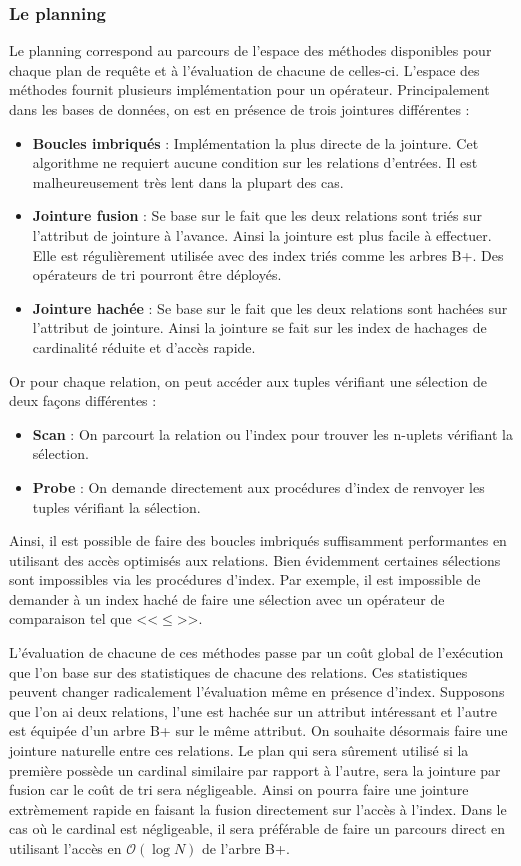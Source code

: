 \subsubsection{Le planning}
Le planning correspond au parcours de l'espace des méthodes disponibles pour chaque plan de requête et à l'évaluation de chacune de celles-ci. L'espace des méthodes fournit plusieurs implémentation pour un opérateur. Principalement dans les bases de données, on est en présence de trois jointures différentes : 
\begin{itemize}
    \item \textbf{Boucles imbriqués} : Implémentation la plus directe de la jointure. Cet algorithme ne requiert aucune condition sur les relations d'entrées. Il est malheureusement très lent dans la plupart des cas.
    \item \textbf{Jointure fusion} : Se base sur le fait que les deux relations sont triés sur l'attribut de jointure à l'avance. Ainsi la jointure est plus facile à effectuer. Elle est régulièrement utilisée avec des index triés comme les arbres B+. Des opérateurs de tri pourront être déployés. 
    \item \textbf{Jointure hachée} : Se base sur le fait que les deux relations sont hachées sur l'attribut de jointure. Ainsi la jointure se fait sur les index de hachages de cardinalité réduite et d'accès rapide. 
\end{itemize}

Or pour chaque relation, on peut accéder aux tuples vérifiant une sélection de deux façons différentes : 
\begin{itemize}
 \item \textbf{Scan} : On parcourt la relation ou l'index pour trouver les n-uplets vérifiant la sélection.
 \item \textbf{Probe} : On demande directement aux procédures d'index de renvoyer les tuples vérifiant la sélection. 
\end{itemize}

Ainsi, il est possible de faire des boucles imbriqués suffisamment performantes en utilisant des accès optimisés aux relations. Bien évidemment certaines sélections sont impossibles via les procédures d'index. Par exemple, il est impossible de demander à un index haché de faire une sélection avec un opérateur de comparaison tel que <<$\leq$>>.

L'évaluation de chacune de ces méthodes passe par un coût global de l'exécution que l'on base sur des statistiques de chacune des relations. Ces statistiques peuvent changer radicalement l'évaluation même en présence d'index. Supposons que l'on ai deux relations, l'une est hachée sur un attribut intéressant et l'autre est équipée d'un arbre B+ sur le même attribut. On souhaite désormais faire une jointure naturelle entre ces relations. Le plan qui sera sûrement utilisé si la première possède un cardinal similaire par rapport à l'autre, sera la jointure par fusion car le coût de tri sera négligeable. Ainsi on pourra faire une jointure extrèmement rapide en faisant la fusion directement sur l'accès à l'index. Dans le cas où le cardinal est négligeable, il sera préférable de faire un parcours direct en utilisant l'accès en $\mathcal O(\log N)$ de l'arbre B+. 

